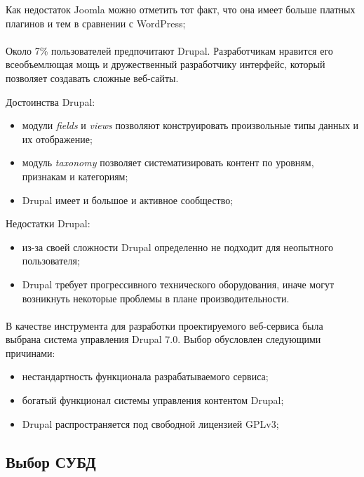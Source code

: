 Как недостаток Joomla можно отметить тот факт, что она имеет
больше платных плагинов и тем в сравнении с WordPress;

\paragraph{}
Около 7\% пользователей предпочитают Drupal. Разработчикам нравится его всеобъемлющая мощь
и дружественный разработчику интерфейс, который позволяет создавать сложные веб-сайты.

Достоинства Drupal:
\begin{itemize}
\item
  модули \textit{fields} и \textit{views} позволяют конструировать произвольные типы данных и их отображение;
\item
  модуль \textit{taxonomy} позволяет систематизировать контент по уровням, признакам и категориям;
\item
  Drupal имеет и большое и активное сообщество;
\end{itemize}

Недостатки Drupal:
\begin{itemize}
\item 
  из-за своей сложности Drupal определенно не подходит для неопытного пользователя;
\item
  Drupal требует прогрессивного технического оборудования,
  иначе могут возникнуть некоторые проблемы в плане производительности.
\end{itemize}

\paragraph{}
В качестве инструмента для разработки проектируемого веб-сервиса была выбрана система управления Drupal 7.0.
Выбор обусловлен следующими причинами:
\begin{itemize}
\item
  нестандартность функционала разрабатываемого сервиса;
\item
  богатый функционал системы управления контентом Drupal;
\item 
  Drupal распространяется под свободной лицензией GPLv3;
\end{itemize}  

\subsection{Выбор СУБД}
\label{ssec:choice_db}

